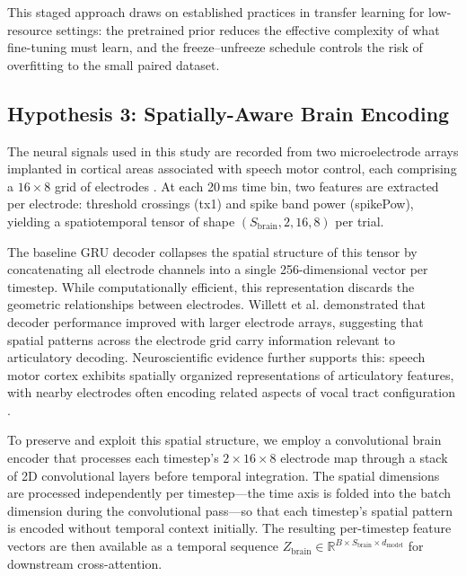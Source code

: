 \documentclass{article}
\begin{document}
This staged approach draws on established practices in transfer
learning for low-resource settings: the pretrained prior reduces the
effective complexity of what fine-tuning must learn, and the
freeze--unfreeze schedule controls the risk of overfitting to the
small paired dataset.
 
\subsection{Hypothesis 3: Spatially-Aware Brain Encoding}
\label{sec:brain_encoder}
 
The neural signals used in this study are recorded from two
microelectrode arrays implanted in cortical areas associated with
speech motor control, each comprising a $16 \times 8$ grid of
electrodes \cite{willett2023high}.  At each 20\,ms time bin, two
features are extracted per electrode: threshold crossings (tx1) and
spike band power (spikePow), yielding a spatiotemporal tensor of
shape $(S_{\text{brain}}, 2, 16, 8)$ per trial.
 
The baseline GRU decoder \cite{willett2024lessons} collapses the
spatial structure of this tensor by concatenating all electrode
channels into a single 256-dimensional vector per timestep.  While
computationally efficient, this representation discards the geometric
relationships between electrodes.  Willett et al.
\cite{willett2023high} demonstrated that decoder performance improved
with larger electrode arrays, suggesting that spatial patterns across
the electrode grid carry information relevant to articulatory
decoding.  Neuroscientific evidence further supports this: speech
motor cortex exhibits spatially organized representations of
articulatory features, with nearby electrodes often encoding related
aspects of vocal tract configuration
\cite{card2024accurate}.
 
To preserve and exploit this spatial structure, we employ a
convolutional brain encoder that processes each timestep's
$2 \times 16 \times 8$ electrode map through a stack of 2D
convolutional layers before temporal integration.  The spatial
dimensions are processed independently per timestep---the time axis is
folded into the batch dimension during the convolutional pass---so
that each timestep's spatial pattern is encoded without temporal
context initially.  The resulting per-timestep feature vectors are
then available as a temporal sequence $Z_{\text{brain}} \in
\mathbb{R}^{B \times S_{\text{brain}} \times d_{\text{model}}}$ for
downstream cross-attention.
 
\end{document}
